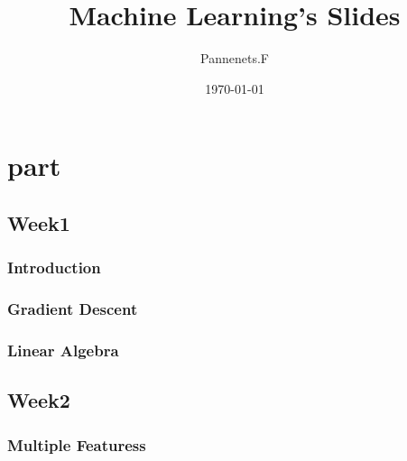 \documentclass[en,11pt,english,black,simple,device=ppt]{elegantbook}
\title{Machine Learning's Slides}
\author{Pannenets.F}
\date{\today}
\begin{document}
\maketitle
\frontmatter


\mainmatter

\part{part}

\chapter{Week1}

\section{Introduction}




\section{Gradient Descent}




\section{Linear Algebra}




\chapter{Week2}

\section{Multiple Featuress}


\end{document}
